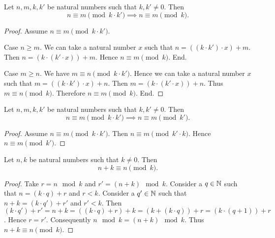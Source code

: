 \documentclass[10pt]{article}
\begin{document}
  \begin{forthel}
    \begin{proposition}
      Let $n, m, k, k'$ be natural numbers such that $k, k' \neq 0$.
      Then \[ n \equiv m \pmod{k \cdot k'} \implies n \equiv m \pmod{k}. \]
    \end{proposition}
    \begin{proof}
      Assume $n \equiv m \pmod{k \cdot k'}$.

      Case $n \geq m$.
        We can take a natural number $x$ such that
        $n = ((k \cdot k') \cdot x) + m$.
        Then $n = (k \cdot (k' \cdot x)) + m$.
        Hence $n \equiv m \pmod{k}$.
      End.

      Case $m \geq n$.
        We have $m \equiv n \pmod{k \cdot k'}$.
        Hence we can take a natural number $x$ such that
        $m = ((k \cdot k') \cdot x) + n$.
        Then $m = (k \cdot (k' \cdot x)) + n$.
        Thus $m \equiv n \pmod{k}$.
        Therefore $n \equiv m \pmod{k}$.
      End.
    \end{proof}
  \end{forthel}

  \begin{forthel}
    \begin{corollary}
      Let $n, m, k, k'$ be natural numbers such that $k, k' \neq 0$.
      Then \[ n \equiv m \pmod{k \cdot k'} \implies n \equiv m \pmod{k'}. \]
    \end{corollary}
    \begin{proof}
      Assume $n \equiv m \pmod{k \cdot k'}$.
      Then $n \equiv m \pmod{k' \cdot k}$.
      Hence $n \equiv m \pmod{k'}$.
    \end{proof}
  \end{forthel}

  \begin{forthel}
    \begin{proposition}
      Let $n, k$ be natural numbers such that $k \neq 0$.
      Then \[ n + k \equiv n \pmod{k}. \]
    \end{proposition}
    \begin{proof}
      Take $r = n \mod k$ and $r' = (n + k) \mod k$.
      Consider a $q \in \mathbb{N}$ such that $n = (k \cdot q) + r$ and $r < k$.
      Consider a $q' \in \mathbb{N}$ such that $n + k = (k \cdot q') + r'$ and
      $r' < k$.
      Then $(k \cdot q') + r'
        = n + k
        = ((k \cdot q) + r) + k
        = (k + (k \cdot q)) + r
        = (k \cdot (q + 1)) + r$.
      Hence $r = r'$.
      Consequently $n \mod k = (n + k) \mod k$.
      Thus $n + k \equiv n \pmod{k}$.
    \end{proof}
  \end{forthel}
\end{document}
